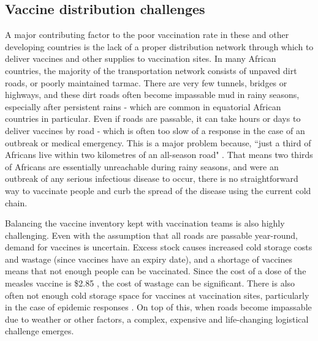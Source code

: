 \subsection{Vaccine distribution challenges}
A major contributing factor to the poor vaccination rate in these and other developing countries is the lack of a proper distribution network through which to deliver vaccines and other supplies to vaccination sites. In many African countries, the majority of the transportation network consists of unpaved dirt roads, or poorly maintained tarmac. There are very few tunnels, bridges or highways, and these dirt roads often become impassable mud in rainy seasons, especially after persistent rains - which are common in equatorial African countries in particular. Even if roads are passable, it can take hours or days to deliver vaccines by road - which is often too slow of a response in the case of an outbreak or medical emergency.
This is a major problem because, ``just a third of Africans live within two kilometres of an all-season road" \citep{harris_2019}. That means two thirds of Africans are essentially unreachable during rainy seasons, and were an outbreak of any serious infectious disease to occur, there is no straightforward way to vaccinate people and curb the spread of the disease using the current cold chain. 


Balancing the vaccine inventory kept with vaccination teams is also highly challenging. Even with the assumption that all roads are passable year-round, demand for vaccines is uncertain. Excess stock causes increased cold storage costs and wastage (since vaccines have an expiry date), and a shortage of vaccines means that not enough people can be vaccinated. Since the cost of a dose of the measles vaccine is \$2.85 \cite{unicef_2019}, the cost of wastage can be significant. There is also often not enough cold storage space for vaccines at vaccination sites, particularly in the case of epidemic responses \citep{humphreys_2011}. On top of this, when roads become impassable due to weather or other factors, a complex, expensive and life-changing logistical challenge emerges.

